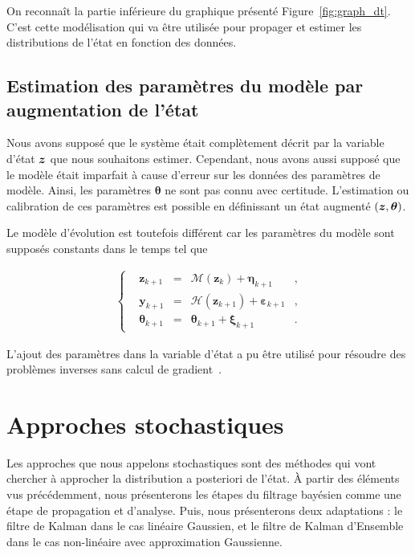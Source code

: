 On reconnaît la partie inférieure du graphique présenté Figure~\ref{fig:graph_dt}. C'est cette modélisation qui va être utilisée pour propager et estimer les distributions de l'état en fonction des données.

\subsection{Estimation des paramètres du modèle par augmentation de l'état}
Nous avons supposé que le système était complètement décrit par la variable d'état $\bm z$ que nous souhaitons estimer. Cependant, nous avons aussi supposé que le modèle était imparfait à cause d'erreur sur les données des paramètres de modèle. Ainsi, les paramètres $\bm \theta$ ne sont pas connu avec certitude. L'estimation ou calibration de ces paramètres est possible en définissant un état augmenté $(\bm z, \bm \theta)$.

Le modèle d'évolution est toutefois différent car les paramètres du modèle sont supposés constants dans le temps tel que

\begin{gather*}
    \left\{\begin{aligned}
         & \bm{z}_{k+1}      & = & \mathcal{M}(\bm{z}_{k}) + \bm{\eta}_{k+1}          & , \\
         & \bm{y}_{k+1}      & = & \mathcal{H}(\bm{z}_{k+1}) + \bm{\varepsilon}_{k+1} & , \\
         & \bm{\theta}_{k+1} & = & \bm{\theta}_{k+1} + \bm{\xi}_{k+1}                 & .
    \end{aligned} \right.
\end{gather*}

L'ajout des paramètres dans la variable d'état a pu être utilisé pour résoudre des problèmes inverses sans calcul de gradient~\cite{iglesias_ensemble_2013}.

\section{Approches stochastiques}

Les approches que nous appelons stochastiques sont des méthodes qui vont chercher à approcher la distribution a posteriori de l'état. À partir des éléments vus précédemment, nous présenterons les étapes du filtrage bayésien comme une étape de propagation et d'analyse. Puis, nous présenterons deux adaptations : le filtre de Kalman dans le cas linéaire Gaussien, et le filtre de Kalman d'Ensemble dans le cas non-linéaire avec approximation Gaussienne.

